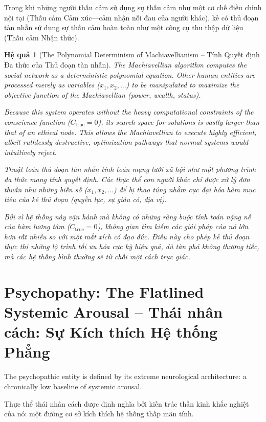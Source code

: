\documentclass{report}
\newtheorem{hequa}{Hệ quả}
\begin{document}
Trong khi những người thấu cảm sử dụng sự thấu cảm như một cơ chế điều chỉnh nội tại (Thấu cảm Cảm xúc—cảm nhận nỗi đau của người khác), kẻ có thủ đoạn tàn nhẫn sử dụng sự thấu cảm hoàn toàn như một công cụ thu thập dữ liệu (Thấu cảm Nhận thức).

\begin{hequa}[The Polynomial Determinism of Machiavellianism -- Tính Quyết định Đa thức của Thủ đoạn tàn nhẫn]
	The Machiavellian algorithm computes the social network as a deterministic polynomial equation. Other human entities are processed merely as variables ($x_1, x_2, ...$) to be manipulated to maximize the objective function of the Machiavellian (power, wealth, status). 
	
	Because this system operates without the heavy computational constraints of the conscience function ($C_{\text{true}} = 0$), its search space for solutions is vastly larger than that of an ethical node. This allows the Machiavellian to execute highly efficient, albeit ruthlessly destructive, optimization pathways that normal systems would intuitively reject.
	
	Thuật toán thủ đoạn tàn nhẫn tính toán mạng lưới xã hội như một phương trình đa thức mang tính quyết định. Các thực thể con người khác chỉ được xử lý đơn thuần như những biến số ($x_1, x_2, ...$) để bị thao túng nhằm cực đại hóa hàm mục tiêu của kẻ thủ đoạn (quyền lực, sự giàu có, địa vị).
	
	Bởi vì hệ thống này vận hành mà không có những ràng buộc tính toán nặng nề của hàm lương tâm ($C_{\text{true}} = 0$), không gian tìm kiếm các giải pháp của nó lớn hơn rất nhiều so với một mắt xích có đạo đức. Điều này cho phép kẻ thủ đoạn thực thi những lộ trình tối ưu hóa cực kỳ hiệu quả, dù tàn phá không thương tiếc, mà các hệ thống bình thường sẽ từ chối một cách trực giác.
\end{hequa}

\section{Psychopathy: The Flatlined Systemic Arousal -- Thái nhân cách: Sự Kích thích Hệ thống Phẳng}

The psychopathic entity is defined by its extreme neurological architecture: a chronically low baseline of systemic arousal. 

Thực thể thái nhân cách được định nghĩa bởi kiến trúc thần kinh khắc nghiệt của nó: một đường cơ sở kích thích hệ thống thấp mãn tính.
\end{document}
